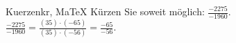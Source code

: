 \begin{MAufgabe}{Kuerzen}{kr, MaTeX}
K\"urzen Sie soweit m\"oglich: $\frac{-2275}{-1960}$.\\ 
\ifLsg\MLoesung
\quad $\frac{-2275}{-1960}=\frac{(35)\cdot(-65)}{(35)\cdot(-56)}=\frac{-65}{-56}$.\else\relax\fi
 \end{MAufgabe}